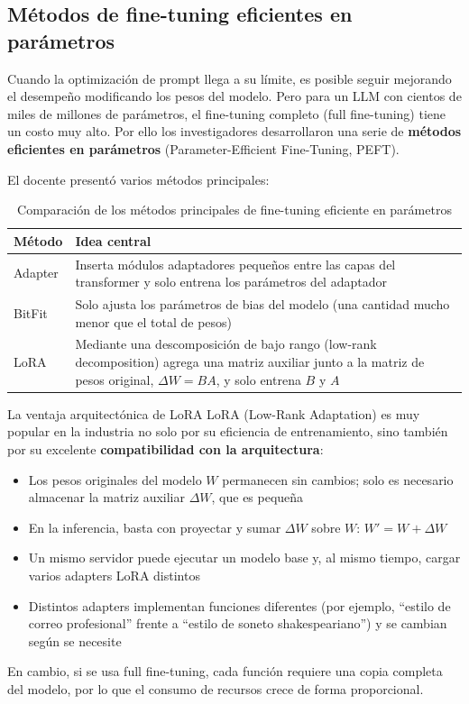 \documentclass[a4paper]{article}
\begin{document}
\subsection{Métodos de fine-tuning eficientes en parámetros}

Cuando la optimización de prompt llega a su límite, es posible seguir mejorando el desempeño modificando los pesos del modelo. Pero para un LLM con cientos de miles de millones de parámetros, el fine-tuning completo (full fine-tuning) tiene un costo muy alto. Por ello los investigadores desarrollaron una serie de \textbf{métodos eficientes en parámetros} (Parameter-Efficient Fine-Tuning, PEFT).

El docente presentó varios métodos principales:

\begin{table}[H]
\centering
\begin{tabular}{lp{8cm}}
\toprule
\textbf{Método} & \textbf{Idea central} \\
\midrule
Adapter & Inserta módulos adaptadores pequeños entre las capas del transformer y solo entrena los parámetros del adaptador \\
BitFit  & Solo ajusta los parámetros de bias del modelo (una cantidad mucho menor que el total de pesos) \\
LoRA    & Mediante una descomposición de bajo rango (low-rank decomposition) agrega una matriz auxiliar junto a la matriz de pesos original, $\Delta W = BA$, y solo entrena $B$ y $A$ \\
\bottomrule
\end{tabular}
\caption{Comparación de los métodos principales de fine-tuning eficiente en parámetros}
\end{table}

\begin{importantbox}{La ventaja arquitectónica de LoRA}
LoRA (Low-Rank Adaptation) es muy popular en la industria no solo por su eficiencia de entrenamiento, sino también por su excelente \textbf{compatibilidad con la arquitectura}:

\begin{itemize}
    \item Los pesos originales del modelo $W$ permanecen sin cambios; solo es necesario almacenar la matriz auxiliar $\Delta W$, que es pequeña
    \item En la inferencia, basta con proyectar y sumar $\Delta W$ sobre $W$: $W' = W + \Delta W$
    \item Un mismo servidor puede ejecutar un modelo base y, al mismo tiempo, cargar varios adapters LoRA distintos
    \item Distintos adapters implementan funciones diferentes (por ejemplo, ``estilo de correo profesional'' frente a ``estilo de soneto shakespeariano'') y se cambian según se necesite
\end{itemize}

En cambio, si se usa full fine-tuning, cada función requiere una copia completa del modelo, por lo que el consumo de recursos crece de forma proporcional.
\end{importantbox}
\end{document}
